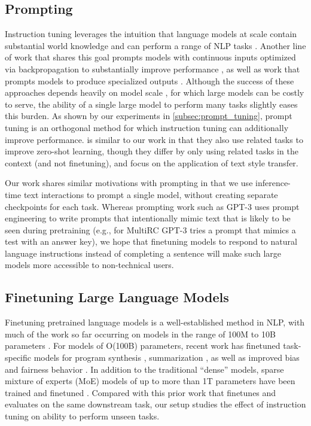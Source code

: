 \subsection{Prompting}
Instruction tuning leverages the intuition that language models at scale contain substantial world knowledge and can perform a range of NLP tasks \citep[][see also \cite{Bommasani2021OnTO}]{brown2020language}.
Another line of work that shares this goal prompts models with continuous inputs optimized via backpropagation to substantially improve performance \citep{li-liang-2021-prefix,lester-prompt-tuning,qin-eisner-2021}, as well as work that prompts models to produce specialized outputs \citep{wei2022chain}.
Although the success of these approaches depends heavily on model scale \citep{lester-prompt-tuning}, for which large models can be costly to serve, the ability of a single large model to perform many tasks slightly eases this burden.
As shown by our experiments in \cref{subsec:prompt_tuning}, prompt tuning is an orthogonal method for which instruction tuning can additionally improve performance.
\citet{reif2021recipe} is similar to our work in that they also use related tasks to improve zero-shot learning, though they differ by only using related tasks in the context (and not finetuning), and focus on the application of text style transfer.

Our work shares similar motivations with prompting in that we use inference-time text interactions to prompt a single model, without creating separate checkpoints for each task. 
Whereas prompting work such as GPT-3 uses prompt engineering to write prompts that intentionally mimic text that is likely to be seen during pretraining (e.g., for MultiRC GPT-3 tries a prompt that mimics a test with an answer key), we hope that finetuning models to respond to natural language instructions instead of completing a sentence will make such large models more accessible to non-technical users.

\subsection{Finetuning Large Language Models}
Finetuning pretrained language models is a well-established method in NLP, with much of the work so far occurring on models in the range of 100M to 10B parameters \cite[][\textit{inter alia}]{dai2015semi,devlin-etal-2019-bert,raffel2019exploring,lewis-etal-2020-bart}.
For models of O(100B) parameters, recent work has finetuned task-specific models for program synthesis \citep{Austin2021ProgramSW,chen2021evaluating}, summarization \citep{wu2021recursively}, as well as improved bias and fairness behavior \citep{solaiman2021process}.
In addition to the traditional ``dense'' models, sparse mixture of experts (MoE) models of up to more than 1T parameters have been trained and finetuned \citep{lepikhin2020gshard,fedus2021switch}.  
Compared with this prior work that finetunes and evaluates on the same downstream task, our setup studies the effect of instruction tuning on ability to perform unseen tasks.

